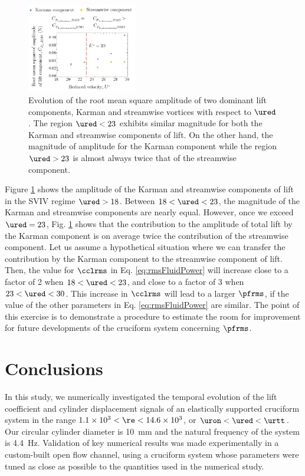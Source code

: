 \documentclass[a4paper,fleqn]{cas-sc}
\begin{document}
\begin{figure}
  \centering
  \includegraphics[width=0.43\textwidth]{figs/figure22}
  \caption{Evolution of the root mean square amplitude of two dominant lift components, Karman and streamwise vortices with respect to $\ured$. The region $\ured < 23$ exhibits similar magnitude for both the Karman and streamwise components of lift. On the other hand, the magnitude of amplitude for the Karman component while the region $\ured > 23$ is almost always twice that of the streamwise component.}
  \label{fig:karmanStreamwiseComponents}
\end{figure}

Figure \ref{fig:karmanStreamwiseComponents} shows the \rms{} amplitude of the Karman and streamwise components of lift in the SVIV regime $\ured > 18$. Between $18 < \ured < 23$, the magnitude of the Karman and streamwise components are nearly equal. However, once we exceed $\ured = 23$, Fig. \ref{fig:karmanStreamwiseComponents} shows that the contribution to the \rms{} amplitude of total lift by the Karman component is on average twice the contribution of the streamwise component. Let us assume a hypothetical situation where we can transfer the contribution by the Karman component to the streamwise component of lift. Then, the value for $\cclrms$ in Eq. \ref{eq:rmsFluidPower} will increase close to a factor of 2 when $18 < \ured < 23$, and close to a factor of 3 when $23 < \ured < 30$. This increase in $\cclrms$ will lead to a larger $\pfrms$, if the value of the other parameters in Eq. \ref{eq:rmsFluidPower} are similar. The point of this exercise is to demonstrate a procedure to estimate the room for improvement for future developments of the cruciform system concerning $\pfrms$.

\section{Conclusions} \label{sec:conclusions}
In this study, we numerically investigated the temporal evolution of the lift coefficient and cylinder displacement signals of an elastically supported cruciform system in the range $1.1 \times 10^{3} < \re < 14.6 \times 10^{3}$, or $\uron < \ured < \urtt$. Our circular cylinder diameter is \SI{10}{\milli\metre} and the natural frequency of the system is \SI{4.4}{\hertz}. Validation of key numerical results was made experimentally in a custom-built open flow channel, using a cruciform system whose parameters were tuned as close as possible to the quantities used in the numerical study.
\end{document}
